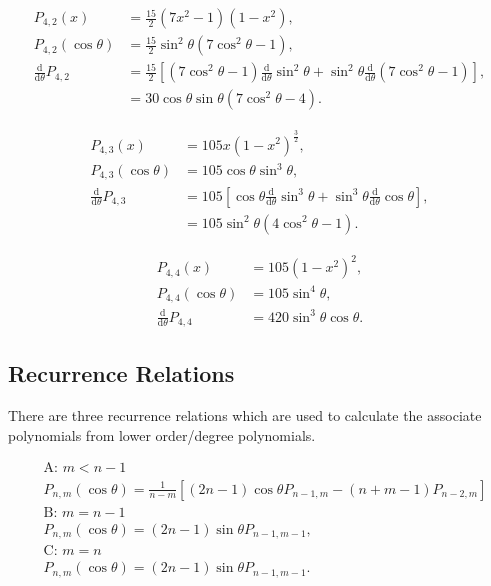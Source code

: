 \documentclass[]{article}
\begin{document}
	\begin{align}
		P_{4,2} (x) &= \frac{15}{2}(7x^2 - 1) (1-x^2), \\
		P_{4,2} (\cos{\theta}) &= \frac{15}{2} \sin^2{\theta}(7\cos^2{\theta} - 1), \\
		\frac{\text{d}}{\text{d} \theta} P_{4,2} &= \frac{15}{2}\left[(7\cos^2{\theta} - 1)\frac{\text{d}}{\text{d}\theta}\sin^2{\theta} + \sin^2{\theta} \frac{\text{d}}{\text{d}\theta}(7\cos^2{\theta} - 1)\right], \\
		&= 30\cos{\theta}\sin{\theta}(7\cos^2{\theta} - 4).
	\end{align}

	\begin{align}
		P_{4,3} (x) &= 105x(1-x^2)^\frac{3}{2}, \\
		P_{4,3} (\cos{\theta}) &= 105 \cos{\theta}\sin^3{\theta}, \\
		\frac{\text{d}}{\text{d} \theta} P_{4,3} &= 105\left[\cos{\theta}\frac{\text{d}}{\text{d}\theta}\sin^3{\theta} + \sin^3{\theta}\frac{\text{d}}{\text{d}\theta}\cos{\theta}\right], \\
		&= 105 \sin^2{\theta}(4\cos^2{\theta} - 1).
	\end{align}	

	\begin{align}
		P_{4,4} (x) &= 105(1-x^2)^2, \\
		P_{4,4} (\cos{\theta}) &= 105 \sin^4{\theta}, \\
		\frac{\text{d}}{\text{d} \theta} P_{4,4} &= 420 \sin^3{\theta} \cos{\theta}.
	\end{align}	
	
	\subsection{Recurrence Relations}
		\label{SectRecurrence}
		There are three recurrence relations which are used to calculate the associate polynomials from lower order/degree polynomials. 
		
		\begin{align}
			&\text{A: }  m < n-1  \nonumber \\ 
			&P_{n,m} (\cos{\theta}) = \frac{1}{n-m} \left[(2n-1)\cos{\theta} P_{n-1,m} - (n + m -1)P_{n-2,m}\right] \\
			&\text{B: }  m = n-1  \nonumber \\ 
			&P_{n,m} (\cos{\theta}) = (2n-1)\sin{\theta} P_{n-1,m-1}, \\
			&\text{C: }  m = n  \nonumber \\ 
			&P_{n,m} (\cos{\theta}) = (2n-1)\sin{\theta} P_{n-1,m-1}.
		\end{align}
		
\end{document}

